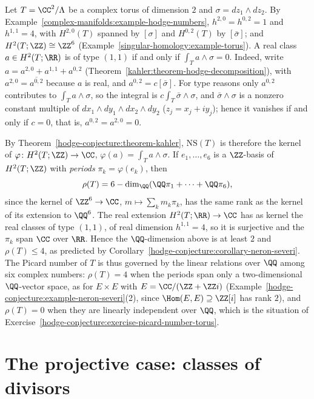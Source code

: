 \begin{example}\label{hodge-conjecture:example-two-torus}
Let $T = \CC^2/\Lambda$ be a complex torus of dimension $2$ and $\sigma = dz_1 \wedge dz_2$. By Example~\ref{complex-manifolds:example-hodge-numbers}, $h^{2,0} = h^{0,2} = 1$ and $h^{1,1} = 4$, with $H^{2,0}(T)$
spanned by $[\sigma]$ and $H^{0,2}(T)$ by $[\bar\sigma]$; and $H^2(T; \ZZ) \cong \ZZ^6$ (Example~\ref{singular-homology:example-torus}). A real class $a \in H^2(T; \RR)$ is of type $(1,1)$ if and only if
$\int_Ta \wedge \sigma = 0$. Indeed, write $a = a^{2,0} + a^{1,1} + a^{0,2}$ (Theorem~\ref{kahler:theorem-hodge-decomposition}), with $a^{2,0} = \overline{a^{0,2}}$ because $a$ is real, and
$a^{0,2} = c[\bar\sigma]$. For type reasons only $a^{0,2}$ contributes to $\int_Ta \wedge \sigma$, so the integral is $c\int_T\bar\sigma \wedge \sigma$, and $\bar\sigma \wedge \sigma$ is a nonzero constant
multiple of $dx_1 \wedge dy_1 \wedge dx_2 \wedge dy_2$ ($z_j = x_j + iy_j$); hence it vanishes if and only if $c = 0$, that is, $a^{0,2} = a^{2,0} = 0$.

By Theorem~\ref{hodge-conjecture:theorem-kahler}, $\mathrm{NS}(T)$ is therefore the kernel of $\varphi \colon H^2(T; \ZZ) \to \CC$, $\varphi(a) = \int_Ta \wedge \sigma$. If $e_1, \ldots, e_6$ is a $\ZZ$-basis of
$H^2(T; \ZZ)$ with \emph{periods} $\pi_k = \varphi(e_k)$, then
\[
\rho(T) = 6 - \dim_\QQ(\QQ\pi_1 + \cdots + \QQ\pi_6),
\]
since the kernel of $\ZZ^6 \to \CC$, $m \mapsto \sum_km_k\pi_k$, has the same rank as the kernel of its extension to $\QQ^6$. The real extension $H^2(T; \RR) \to \CC$ has as kernel the real classes of type
$(1,1)$, of real dimension $h^{1,1} = 4$, so it is surjective and the $\pi_k$ span $\CC$ over $\RR$. Hence the $\QQ$-dimension above is at least $2$ and $\rho(T) \leq 4$, as predicted by
Corollary~\ref{hodge-conjecture:corollary-neron-severi}. The Picard number of $T$ is thus governed by the linear relations over $\QQ$ among six complex numbers: $\rho(T) = 4$ when the periods span only a
two-dimensional $\QQ$-vector space, as for $E \times E$ with $E = \CC/(\ZZ + \ZZ i)$ (Example~\ref{hodge-conjecture:example-neron-severi}(2), since $\Hom(E, E) \supseteq \ZZ[i]$ has rank $2$), and
$\rho(T) = 0$ when they are linearly independent over $\QQ$, which is the situation of Exercise~\ref{hodge-conjecture:exercise-picard-number-torus}.
\end{example}

\section{The projective case: classes of divisors}\label{hodge-conjecture:section-projective}

